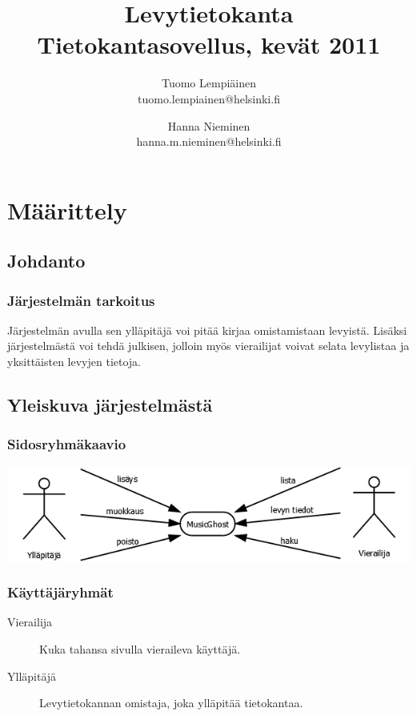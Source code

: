 \documentclass[a4paper,12pt]{report}
\title{Levytietokanta\\
  \large{Tietokantasovellus, kevät 2011}\\}
\author{Tuomo Lempiäinen\\tuomo.lempiainen@helsinki.fi \and
Hanna Nieminen\\hanna.m.nieminen@helsinki.fi}
\begin{document}
\maketitle

\tableofcontents

\chapter{Määrittely}

\section{Johdanto}

\subsection{Järjestelmän tarkoitus}
Järjestelmän avulla sen ylläpitäjä voi pitää kirjaa omistamistaan levyistä.
Lisäksi järjestelmästä voi tehdä julkisen, jolloin myös vierailijat voivat
selata levylistaa ja yksittäisten levyjen tietoja.

\section{Yleiskuva järjestelmästä}

\subsection{Sidosryhmäkaavio}
\vspace{1em}
\includegraphics[width=\linewidth]{sidosryhmakaavio}

\subsection{Käyttäjäryhmät}
\begin{description}
\item[Vierailija] Kuka tahansa sivulla vieraileva käyttäjä.
\item[Ylläpitäjä] Levytietokannan omistaja, joka ylläpitää tietokantaa.
\end{description}
\end{document}
